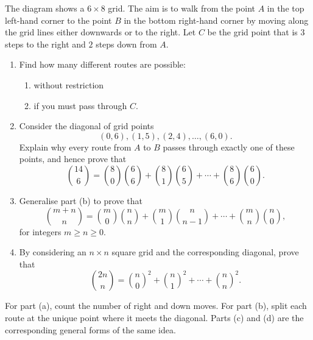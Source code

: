 \begin{problem}
The diagram shows a $6\times 8$ grid. The aim is to walk from the point $A$ in the top left-hand corner to the point $B$ in the bottom right-hand corner by moving along the grid lines either downwards or to the right. 
Let $C$ be the grid point that is $3$ steps to the right and $2$ steps down from $A$.

\begin{center}
\end{center}

\begin{enumerate}[label=\alph*)]
\item Find how many different routes are possible:
\begin{enumerate}[label=\roman*)]
\item without restriction
\item if you must pass through $C$.
\end{enumerate}

\item Consider the diagonal of grid points
\[
(0,6),(1,5),(2,4),\dots,(6,0).
\]
Explain why every route from $A$ to $B$ passes through exactly one of these points, and hence prove that
\[
\binom{14}{6}
=
\binom{8}{0}\binom{6}{6}
+\binom{8}{1}\binom{6}{5}
+\cdots
+\binom{8}{6}\binom{6}{0}.
\]

\item Generalise part (b) to prove that
\[
\binom{m+n}{n}
=
\binom{m}{0}\binom{n}{n}
+\binom{m}{1}\binom{n}{n-1}
+\cdots
+\binom{m}{n}\binom{n}{0},
\]
for integers $m\ge n\ge 0$.

\item By considering an $n\times n$ square grid and the corresponding diagonal, prove that
\[
\binom{2n}{n}
=
\binom{n}{0}^2+\binom{n}{1}^2+\cdots+\binom{n}{n}^2.
\]
\end{enumerate}
\end{problem}

\begin{hint}
For part (a), count the number of right and down moves. For part (b), split each route at the unique point where it meets the diagonal. Parts (c) and (d) are the corresponding general forms of the same idea.
\end{hint}

